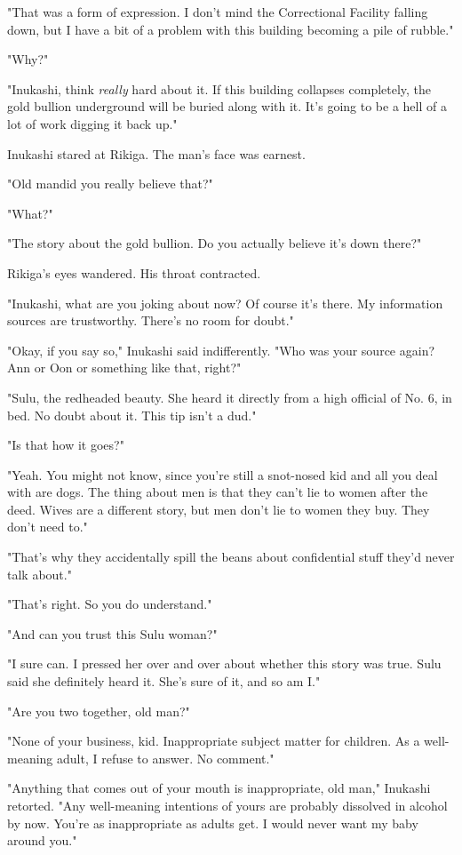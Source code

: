 "That was a form of expression. I don't mind the Correctional Facility
falling down, but I have a bit of a problem with this building becoming
a pile of rubble."

"Why?"

"Inukashi, think \emph{really} hard about it. If this building collapses
completely, the gold bullion underground will be buried along with it.
It's going to be a hell of a lot of work digging it back up."

Inukashi stared at Rikiga. The man's face was earnest.

"Old man\el did you really believe that?"

"What?"

"The story about the gold bullion. Do you actually believe it's down
there?"

Rikiga's eyes wandered. His throat contracted.

"Inukashi, what are you joking about now? Of course it's there. My
information sources are trustworthy. There's no room for doubt."

"Okay, if you say so," Inukashi said indifferently. "Who was your source
again? Ann or Oon or something like that, right?"

"Sulu, the redheaded beauty. She heard it directly from a high official
of No. 6, in bed. No doubt about it. This tip isn't a dud."

"Is that how it goes?"

"Yeah. You might not know, since you're still a snot-nosed kid and all
you deal with are dogs. The thing about men is that they can't lie to
women after the deed. Wives are a different story, but men don't lie to
women they buy. They don't need to."

"That's why they accidentally spill the beans about confidential stuff
they'd never talk about."

"That's right. So you do understand."

"And can you trust this Sulu woman?"

"I sure can. I pressed her over and over about whether this story was
true. Sulu said she definitely heard it. She's sure of it, and so am I."

"Are you two together, old man?"

"None of your business, kid. Inappropriate subject matter for children.
As a well-meaning adult, I refuse to answer. No comment."

"Anything that comes out of your mouth is inappropriate, old man,"
Inukashi retorted. "Any well-meaning intentions of yours are probably
dissolved in alcohol by now. You're as inappropriate as adults get. I
would never want my baby around you."

